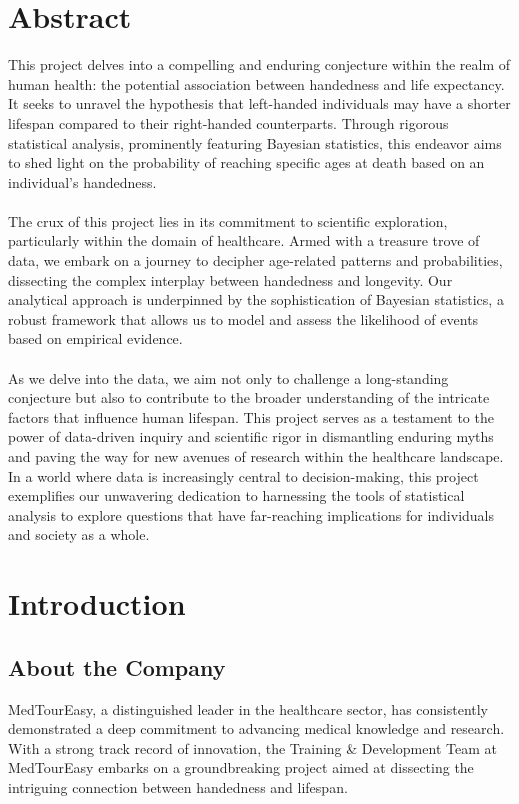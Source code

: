 \documentclass{article}
\begin{document}
\section*{Abstract}
\large{This project delves into a compelling and enduring conjecture within the realm of human health: the potential association between handedness and life expectancy. It seeks to unravel the hypothesis that left-handed individuals may have a shorter lifespan compared to their right-handed counterparts. Through rigorous statistical analysis, prominently featuring Bayesian statistics, this endeavor aims to shed light on the probability of reaching specific ages at death based on an individual's handedness. \\ \\ The crux of this project lies in its commitment to scientific exploration, particularly within the domain of healthcare. Armed with a treasure trove of data, we embark on a journey to decipher age-related patterns and probabilities, dissecting the complex interplay between handedness and longevity. Our analytical approach is underpinned by the sophistication of Bayesian statistics, a robust framework that allows us to model and assess the likelihood of events based on empirical evidence. \\ \\ As we delve into the data, we aim not only to challenge a long-standing conjecture but also to contribute to the broader understanding of the intricate factors that influence human lifespan. This project serves as a testament to the power of data-driven inquiry and scientific rigor in dismantling enduring myths and paving the way for new avenues of research within the healthcare landscape. In a world where data is increasingly central to decision-making, this project exemplifies our unwavering dedication to harnessing the tools of statistical analysis to explore questions that have far-reaching implications for individuals and society as a whole. }


\newpage
\section{Introduction}
\subsection{About the Company}
MedTourEasy, a distinguished leader in the healthcare sector, has consistently demonstrated a deep commitment to advancing medical knowledge and research. With a strong track record of innovation, the Training & Development Team at MedTourEasy embarks on a groundbreaking project aimed at dissecting the intriguing connection between handedness and lifespan.  
\end{document}
